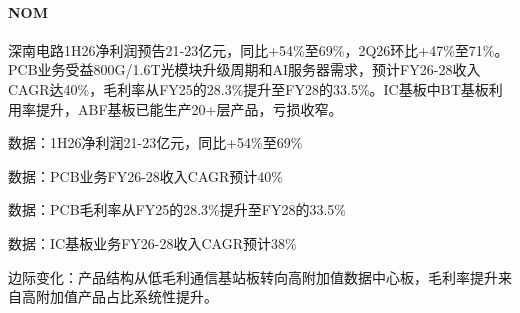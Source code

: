 \documentclass[11pt]{ctexart}
\begin{document}
\paragraph{NOM} 深南电路1H26净利润预告21-23亿元，同比+54\%至69\%，2Q26环比+47\%至71\%。PCB业务受益800G/1.6T光模块升级周期和AI服务器需求，预计FY26-28收入CAGR达40\%，毛利率从FY25的28.3\%提升至FY28的33.5\%。IC基板中BT基板利用率提升，ABF基板已能生产20+层产品，亏损收窄。
{\small\color{refgray}数据：1H26净利润21-23亿元，同比+54\%至69\%\par}
{\small\color{refgray}数据：PCB业务FY26-28收入CAGR预计40\%\par}
{\small\color{refgray}数据：PCB毛利率从FY25的28.3\%提升至FY28的33.5\%\par}
{\small\color{refgray}数据：IC基板业务FY26-28收入CAGR预计38\%\par}
{\small\color{refgray}边际变化：产品结构从低毛利通信基站板转向高附加值数据中心板，毛利率提升来自高附加值产品占比系统性提升。\par}
\end{document}
